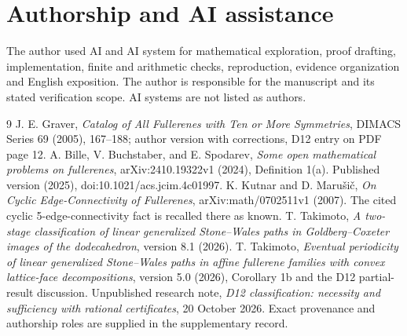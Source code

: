\documentclass[11pt]{amsart}
\theoremstyle{definition}\newtheorem{definition}[theorem]{Definition}
\begin{document}
\section*{Authorship and AI assistance}
The author used AI and AI system for mathematical exploration,
proof drafting, implementation, finite and arithmetic checks,
reproduction, evidence organization and English exposition. The author
is responsible for the manuscript and its stated verification scope.
AI systems are not listed as authors.

\begin{thebibliography}{9}
 J. E. Graver,
\emph{Catalog of All Fullerenes with Ten or More Symmetries},
DIMACS Series 69 (2005), 167--188; author version with corrections,
D12 entry on PDF page 12.
 A. Bille, V. Buchstaber, and E. Spodarev,
\emph{Some open mathematical problems on fullerenes},
arXiv:2410.19322v1 (2024), Definition 1(a).
Published version (2025), doi:10.1021/acs.jcim.4c01997.
 K. Kutnar and D. Maru\v{s}i\v{c},
\emph{On Cyclic Edge-Connectivity of Fullerenes},
arXiv:math/0702511v1 (2007). The cited cyclic 5-edge-connectivity fact
is recalled there as known.
 T. Takimoto,
\emph{A two-stage classification of linear generalized Stone--Wales paths
in Goldberg--Coxeter images of the dodecahedron}, version 8.1 (2026).
 T. Takimoto,
\emph{Eventual periodicity of linear generalized Stone--Wales paths in
affine fullerene families with convex lattice-face decompositions},
version 5.0 (2026), Corollary 1b and the D12 partial-result discussion.
 Unpublished research note,
\emph{D12 classification: necessity and sufficiency with rational
certificates}, 20 October 2026. Exact provenance and authorship roles
are supplied in the supplementary record.
\end{thebibliography}
\end{document}

